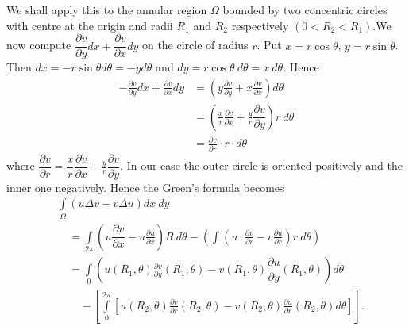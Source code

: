 We shall apply this to the annular region $\Omega$ bounded by two concentric circles with centre at the origin and radii $R_{1}$ and $R_{2}$ respectively $(0<R_{2}<R_{1})$.\pageoriginale We now compute $\dfrac{\partial v}{\partial y}dx+\dfrac{\partial v}{\partial x}dy$ on the circle of radius $r$. Put $x=r\cos \theta$, $y=r\sin \theta$. Then $dx=-r\sin \theta d\theta=-y d\theta$ and $dy=r\cos \theta \ d\theta=x \ d\theta$. Hence
\begin{align*}
-\frac{\partial v}{\partial y}dx+\frac{\partial v}{\partial x}dy &= \left(y\frac{\partial v}{\partial y}+x\frac{\partial v}{\partial x}\right)d\theta\\[4pt]
&= \left(\frac{x}{r}\frac{\partial v}{\partial x}+\frac{y}{r}\dfrac{\partial v}{\partial y}\right)r \ d \theta\\[4pt]
&= \frac{\partial v}{\partial r}\cdot r\cdot d\theta
\end{align*}
where $\dfrac{\partial v}{\partial r}=\dfrac{x}{r}\dfrac{\partial v}{\partial x}+\frac{y}{r}\dfrac{\partial v}{\partial y}$. In our case the outer circle is oriented positively and the inner one negatively. Hence the Green's formula becomes
\begin{align*}
& \int\limits_{\Omega} (u\Delta v - v\Delta u)dx \ dy\\[3pt]
&\quad =\int\limits_{2\pi}\left(u\dfrac{\partial v}{\partial x}-u\frac{\partial u}{\partial x}\right)R \ d\theta -\left(\int\left(u\cdot \frac{\partial v}{\partial r}-v\frac{\partial u}{\partial r}\right)r \ d\theta\right)\\[3pt]
&\quad =\int\limits_{0}\left(u(R_{1},\theta)\frac{\partial v}{\partial y}(R_{1},\theta)-v(R_{1},\theta)\dfrac{\partial u}{\partial y}(R_{1},\theta)\right)d\theta\\[3pt]
&\qquad -\left[\int\limits^{2\pi}_{0}\left[u(R_{2},\theta)\frac{\partial v}{\partial r}(R_{2},\theta)-v(R_{2},\theta)\frac{\partial u}{\partial r}(R_{2},\theta)d\theta\right]\right].
\end{align*}

